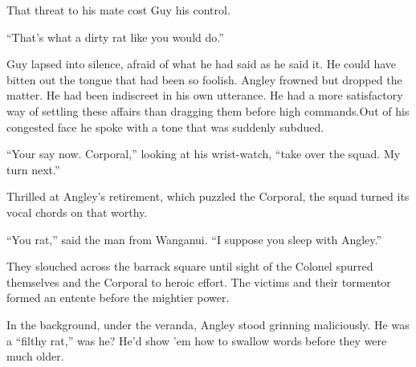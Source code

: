 That threat to his mate cost Guy his control.

``That's what a dirty rat like you would do.''

Guy lapsed into silence, afraid of what he had said as he said it. He could 
have bitten out the tongue that had been so foolish. Angley frowned but 
dropped the matter. He had been indiscreet in his own utterance. He had a 
more satisfactory way of settling these affairs than dragging them before 
high commands.Out of his congested face he spoke with a tone that was 
suddenly subdued.

``Your say now. Corporal,'' looking at his wrist-watch, ``take over the squad. 
My turn next.''

Thrilled at Angley's retirement, which puzzled the Corporal, the squad turned 
its vocal chords on that worthy.

``You rat,'' said the man from Wanganui. ``I suppose you sleep with Angley.''

They slouched across the barrack square until sight of the Colonel spurred 
themselves and the Corporal to heroic effort. The victims and their tormentor 
formed an entente before the mightier power.

In the background, under the veranda, Angley stood grinning maliciously. He 
was a ``filthy rat,'' was he? He'd show 'em how to swallow words before they 
were much older.